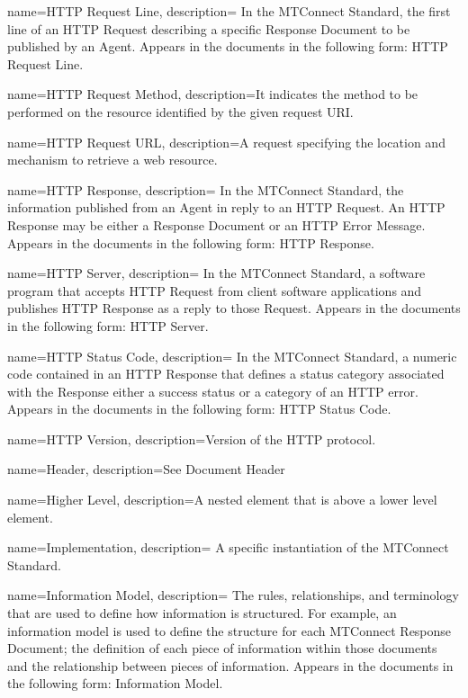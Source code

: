 {
    name={HTTP Request Line},
	description={
	In the MTConnect Standard, the first line of an \gls{HTTP Request} describing a specific \gls{Response Document} to be published by an \gls{Agent}.
	Appears in the documents in the following form: \gls{HTTP Request Line}.
}
}

{
    name={HTTP Request Method},
	description={It indicates the method to be performed on the resource identified by the given request URI.}
}

{
    name={HTTP Request URL},
	description={A request specifying the location and mechanism to retrieve a web resource.}
}

{
    name={HTTP Response},
	description={
	In the MTConnect Standard, the information published from an \gls{Agent} in reply to an \gls{HTTP Request}.  An \gls{HTTP Response} may be either a \gls{Response Document} or an \gls{HTTP Error Message}.
	Appears in the documents in the following form: \gls{HTTP Response}.
}
}

{
    name={HTTP Server},
	description={
	In the MTConnect Standard, a software program that accepts \gls{HTTP Request} from client software applications and publishes \gls{HTTP Response} as a reply to those \gls{Request}.
	Appears in the documents in the following form: \gls{HTTP Server}.
}
}

{
    name={HTTP Status Code},
	description={
	In the MTConnect Standard, a numeric code contained in an \gls{HTTP Response} that defines a status category associated with the \gls{Response}  either a success status or a category of an HTTP error.  
	Appears in the documents in the following form: \gls{HTTP Status Code}.
}
}

{
    name={HTTP Version},
	description={Version of the HTTP protocol.}
}

{
    name={Header},
	description={See \gls{Document Header}}
}

{
    name={Higher Level},
	description={A nested element that is above a lower level element.}
}

{
    name={Implementation},
	description={
	A specific instantiation of the MTConnect Standard.
}
}

{
    name={Information Model},
	description={
	The rules, relationships, and terminology that are used to define how information is structured.
	For example, an information model is used to define the structure for each \gls{MTConnect Response Document}; the definition of each piece of information within those documents and the relationship between pieces of information.
	Appears in the documents in the following form: \gls{Information Model}.
}
}

